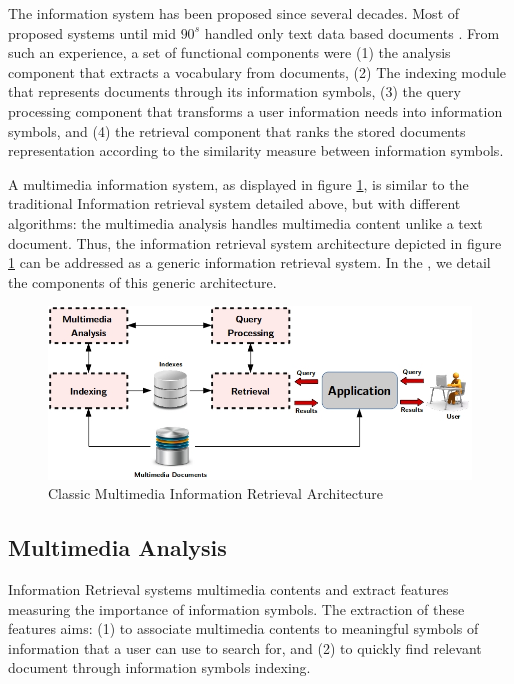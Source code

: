 	The information system has been proposed since several decades. Most of proposed systems
	until mid $90^{s}$ handled only text data based documents \citep{Manning2008,Marcia2012}.
	 From such an experience, a set of functional components were 
	(1) the analysis component that extracts a vocabulary from documents, 
	(2) The indexing module that represents documents through its information symbols, 
	(3) the query processing component that transforms a user information needs into information symbols, and 
	(4) the retrieval component that ranks the stored documents representation according to the similarity 
	measure between information symbols.

	A multimedia information system, as displayed in figure \ref{state_fig4}, is similar to the traditional 
	Information retrieval system detailed above, but with different algorithms: the multimedia analysis handles 
	multimedia content unlike a text document. Thus, the information retrieval system architecture depicted in 
	figure \ref{state_fig4} can be addressed as a generic information retrieval system. In the , we detail 
	the components of this generic architecture.

	\begin{figure}[ht]
		\centering
		\includegraphics[scale=0.7]{figures/state_fig2}
		\caption{Classic Multimedia Information Retrieval Architecture}
		\label{state_fig4}
	\end{figure}

		\subsection{Multimedia Analysis}	

		Information Retrieval systems  multimedia contents and extract features measuring 
		the importance of information symbols. The extraction of these features aims: 
		(1) to associate multimedia contents to meaningful symbols of information that 
		a user can use to search for, and (2) to quickly find relevant document through
		information symbols indexing.

